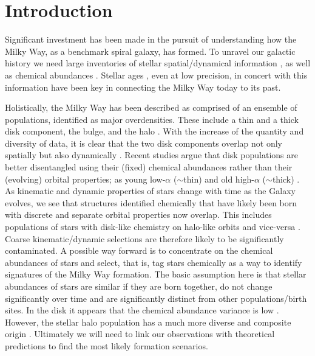 \documentclass[fleqn,usenatbib]{mnras}
\begin{document}



\section{Introduction} \label{sec:introduction}

Significant investment has been made in the pursuit of understanding how the Milky Way, as a benchmark spiral galaxy, has formed. To unravel our galactic history we need large inventories of stellar spatial/dynamical information \citep[e.g.][]{Brown2021}, as well as chemical abundances \citep{Jofre2019}. Stellar ages \citep{Soderblom2010}, even at low precision, in concert with this information have been key in connecting the Milky Way today to its past.

Holistically, the Milky Way has been described as comprised of an ensemble of populations, identified as major overdensities. These include a thin and a thick disk component, the bulge, and the halo \citep[see e.g.][for a review]{BlandHawthorn_Gerhard2016}. With the increase of the quantity and diversity of data, it is clear that the two disk components overlap not only spatially but also dynamically \citep[e.g.][]{Bovy2012b}. Recent studies argue that disk populations are better disentangled using their (fixed) chemical abundances rather than their (evolving) orbital properties; as young low-$\alpha$ ($\sim$thin) and old high-$\alpha$ ($\sim$thick) \citep[e.g.][]{Bensby2014, Buder2019, BlandHawthorn2019}. As kinematic and dynamic properties of stars change with time as the Galaxy evolves, we see that structures identified chemically that have likely been born with discrete and separate orbital properties now overlap. This includes populations of stars with disk-like chemistry on halo-like orbits and vice-versa \citep[e.g.][]{Belokurov2020, Sestito2020}. Coarse kinematic/dynamic selections are therefore likely to be significantly contaminated. A possible way forward is to concentrate on the chemical abundances of stars and select, that is, tag stars chemically \citep[see e.g.][for a review on chemical tagging]{FreemanBlandHawthorn2002} as a way to identify signatures of the Milky Way formation. The basic assumption here is that stellar abundances of stars are similar if they are born together, do not change significantly over time and are significantly distinct from other populations/birth sites. In the disk it appears that the chemical abundance variance is low \citep{Bovy2016b, Ness2018, Ness2019b}. However, the stellar halo population has a much more diverse and composite origin \citep[e.g.][]{Helmi2020, Naidu2020}. Ultimately we will need to link our observations with theoretical predictions to find the most likely formation scenarios. 
\end{document}
